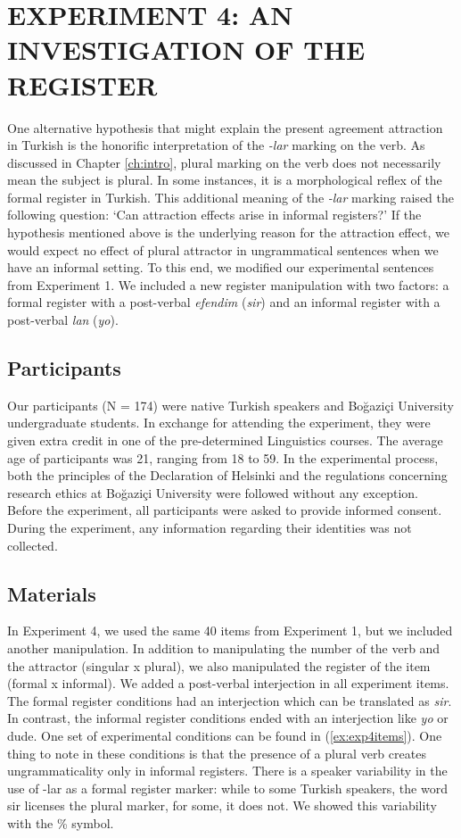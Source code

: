 

\chapter{EXPERIMENT 4: AN INVESTIGATION OF THE REGISTER} \label{ap:exp4}

One alternative hypothesis that might explain the present agreement attraction in Turkish is the honorific interpretation of the \emph{-lar} marking on the verb. As discussed in Chapter \ref{ch:intro}, plural marking on the verb does not necessarily mean the subject is plural. In some instances, it is a morphological reflex of the formal register in Turkish. This additional meaning of the \emph{-lar} marking raised the following question: `Can attraction effects arise in informal registers?' If the hypothesis mentioned above is the underlying reason for the attraction effect, we would expect no effect of plural attractor in ungrammatical sentences when we have an informal setting. To this end, we modified our experimental sentences from Experiment 1. We included a new register manipulation with two factors: a formal register with a post-verbal \emph{efendim} (\emph{sir}) and an informal register with a post-verbal \emph{lan} (\emph{yo}). 

\section{Participants}
Our participants (N = 174) were native Turkish speakers and Bo\u{g}azi\c{c}i University undergraduate students. In exchange for attending the experiment, they were given extra credit in one of the pre-determined Linguistics courses. The average age of participants was 21, ranging from 18 to 59. In the experimental process, both the principles of the Declaration of Helsinki and the regulations concerning research ethics at Bo\u{g}azi\c{c}i University were followed without any exception. Before the experiment, all participants were asked to provide informed consent. During the experiment, any information regarding their identities was not collected. 

\section{Materials}

In Experiment 4, we used the same 40 items from Experiment 1, but we included another manipulation. In addition to manipulating the number of the verb and the attractor (singular x plural), we also manipulated the register of the item (formal x informal). We added a post-verbal interjection in all experiment items. The formal register conditions had an interjection which can be translated as \emph{sir}. In contrast, the informal register conditions ended with an interjection like \emph{yo} or dude. One set of experimental conditions can be found in (\ref{ex:exp4items}). One thing to note in these conditions is that the presence of a plural verb creates ungrammaticality only in informal registers. There is a speaker variability in the use of -lar as a formal register marker: while to some Turkish speakers, the word sir licenses the plural marker, for some, it does not. We showed this variability with the \% symbol.


